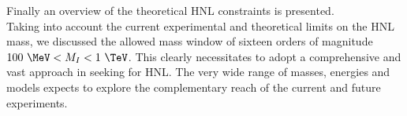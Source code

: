 Finally an overview of the theoretical HNL
constraints is presented.\\
Taking into account 
the current experimental and theoretical limits on the HNL
mass, we discussed the allowed mass window of sixteen orders of magnitude
$100\ \MeV < M_{I} < 1\ \TeV$. This clearly necessitates to adopt a
comprehensive and vast approach in seeking for HNL.
The very wide range of masses, energies and models expects to
explore the complementary reach of the current and future experiments.\\











